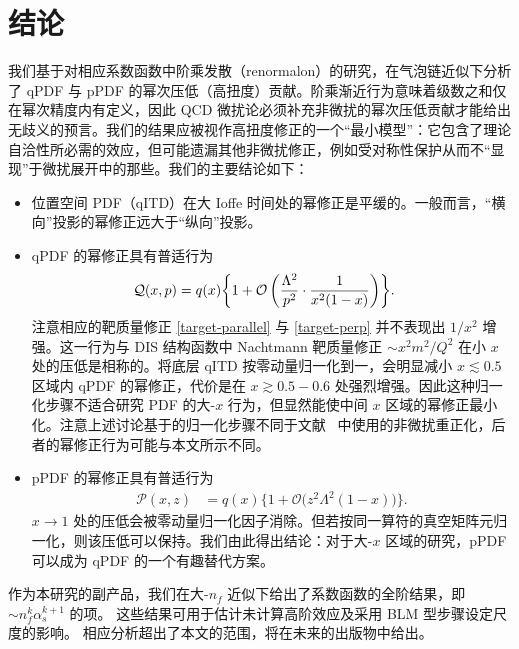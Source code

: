 \section{结论}
%

我们基于对相应系数函数中阶乘发散（renormalon）的研究，在气泡链近似下分析了 qPDF 与 pPDF 的幂次压低（高扭度）贡献。阶乘渐近行为意味着级数之和仅在幂次精度内有定义，因此 QCD 微扰论必须补充非微扰的幂次压低贡献才能给出无歧义的预言。我们的结果应被视作高扭度修正的一个``最小模型''：它包含了理论自洽性所必需的效应，但可能遗漏其他非微扰修正，例如受对称性保护从而不``显现''于微扰展开中的那些。我们的主要结论如下：
\begin{itemize}
\item 位置空间 PDF（qITD）在大 Ioffe 时间处的幂修正是平缓的。一般而言，``横向''投影的幂修正远大于``纵向''投影。
\item qPDF 的幂修正具有普适行为
\begin{align}
  \mathcal{Q} (x,p) &=  q(x) \biggl\{1 + \mathcal{O}\left( \frac{\Lambda^2}{p^2}\cdot\frac{1}{{x^2(1-x)}}\right) \biggr\}.
\end{align}
注意相应的靶质量修正 \eqref{target-parallel} 与 \eqref{target-perp} 并不表现出 $1/x^2$ 增强。这一行为与 DIS 结构函数中 Nachtmann 靶质量修正 $\sim x^2 m^2/Q^2$ 在小 $x$ 处的压低是相称的。将底层 qITD 按零动量归一化到一，会明显减小 $ x \lesssim 0.5$ 区域内 qPDF 的幂修正，代价是在 $x\gtrsim 0.5-0.6$ 处强烈增强。因此这种归一化步骤不适合研究 PDF 的大-$x$ 行为，但显然能使中间 $x$ 区域的幂修正最小化。注意上述讨论基于的归一化步骤不同于文献~\cite{Chen:2018xof} 中使用的非微扰重正化，后者的幂修正行为可能与本文所示不同。
\item
pPDF 的幂修正具有普适行为
\begin{align}
\mathcal{P}(x,z) &= q(x)\Big\{1 + \mathcal{O}\big( z^2\!\Lambda^2{(1-x)}\big)\Big\}.
\end{align}
$x\to 1$ 处的压低会被零动量归一化因子消除。但若按同一算符的真空矩阵元归一化，则该压低可以保持。我们由此得出结论：对于大-$x$ 区域的研究，pPDF 可以成为 qPDF 的一个有趣替代方案。
\end{itemize}
作为本研究的副产品，我们在大-$n_f$ 近似下给出了系数函数的全阶结果，即 $\sim n_f^k\alpha_s^{k+1}$ 的项。
这些结果可用于估计未计算高阶效应及采用 BLM 型步骤设定尺度的影响。
相应分析超出了本文的范围，将在未来的出版物中给出。

